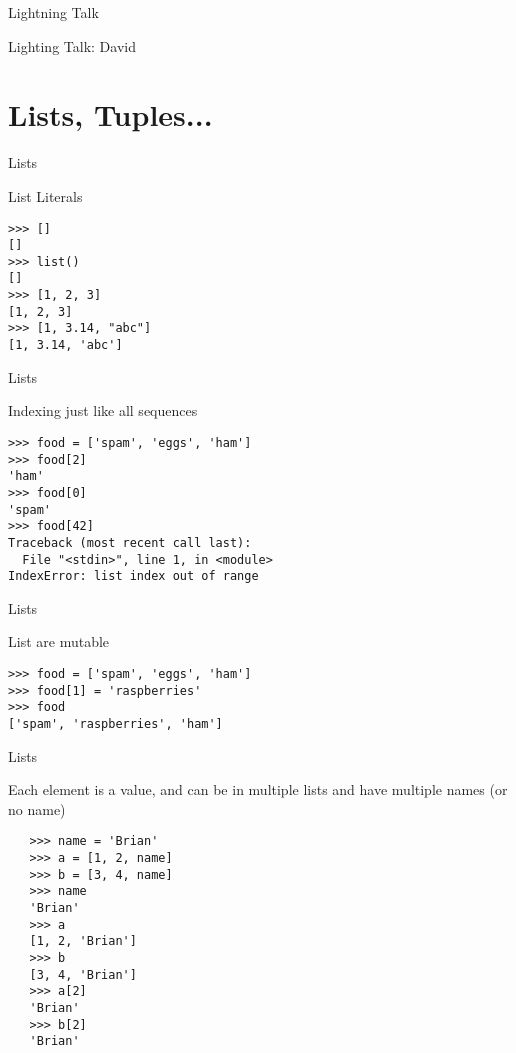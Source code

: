 \documentclass{beamer}
\begin{document}
\begin{frame}{Lightning Talk}

{\center

\LARGE Lighting Talk:
\vfill
David
\vfill

}
\end{frame}

\section{Lists, Tuples...}

\begin{frame}[fragile]{Lists}

 {\Large List Literals}

\begin{verbatim}
>>> []
[]
>>> list()
[]
>>> [1, 2, 3]
[1, 2, 3]
>>> [1, 3.14, "abc"]
[1, 3.14, 'abc']
\end{verbatim}

\end{frame} 

\begin{frame}[fragile]{Lists}

 {\Large Indexing just like all sequences}

\begin{verbatim}
>>> food = ['spam', 'eggs', 'ham']
>>> food[2]
'ham'
>>> food[0]
'spam'
>>> food[42]
Traceback (most recent call last):
  File "<stdin>", line 1, in <module>
IndexError: list index out of range
\end{verbatim}

\end{frame} 

\begin{frame}[fragile]{Lists}

{\Large List are mutable}

\begin{verbatim}
>>> food = ['spam', 'eggs', 'ham']
>>> food[1] = 'raspberries'
>>> food
['spam', 'raspberries', 'ham']
\end{verbatim}

\end{frame} 

\begin{frame}[fragile]{Lists}

{\Large Each element is a value, and can be in multiple lists and have multiple
names (or no name)}

\begin{verbatim}
￼  >>> name = 'Brian'
   >>> a = [1, 2, name]
   >>> b = [3, 4, name]
   >>> name
   'Brian'
   >>> a
   [1, 2, 'Brian']
   >>> b
   [3, 4, 'Brian']
   >>> a[2]
   'Brian'
   >>> b[2]
   'Brian'
\end{verbatim}

\end{frame} 
\end{document}
